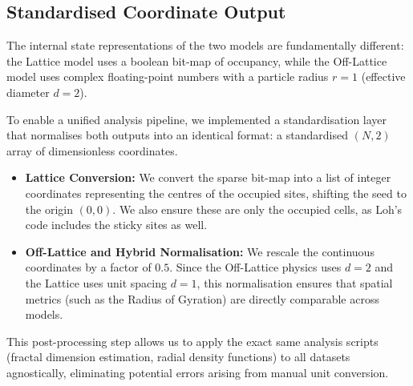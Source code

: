 \documentclass[12pt, a4paper, oneside]{report}
\theoremstyle{remark}
\begin{document}
\subsection{Standardised Coordinate Output}
The internal state representations of the two models are fundamentally different: the Lattice model uses a boolean bit-map of occupancy, while the Off-Lattice model uses complex floating-point numbers with a particle radius $r=1$ (effective diameter $d=2$).

To enable a unified analysis pipeline, we implemented a standardisation layer that normalises both outputs into an identical format: a standardised $(N, 2)$ array of dimensionless coordinates.

\begin{itemize}
    \item \textbf{Lattice Conversion:} We convert the sparse bit-map into a list of integer coordinates representing the centres of the occupied sites, shifting the seed to the origin $(0,0)$. We also ensure these are only the occupied cells, as Loh's code includes the sticky sites as well.
    \item \textbf{Off-Lattice and Hybrid Normalisation:} We rescale the continuous coordinates by a factor of $0.5$. Since the Off-Lattice physics uses $d=2$ and the Lattice uses unit spacing $d=1$, this normalisation ensures that spatial metrics (such as the Radius of Gyration) are directly comparable across models.
\end{itemize}

This post-processing step allows us to apply the exact same analysis scripts (fractal dimension estimation, radial density functions) to all datasets agnostically, eliminating potential errors arising from manual unit conversion.



\end{document}
